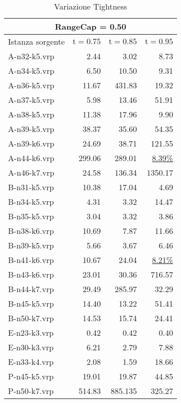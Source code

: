 \documentclass[11pt,oneside,a4paper]{article}
\begin{document}
\begin{table}
\centering
\begin{tabular}{|l|r|r|r|}
\hline
\multicolumn{4}{|c|}{RangeCap = 0.50} \\
\hline
Istanza sorgente & $\text{t}=0.75$ & $\text{t}=0.85$ & $\text{t}=0.95$ \\
\hline

A-n32-k5.vrp & 2.44 & 3.02 & 8.73 \\ 
A-n34-k5.vrp & 6.50 & 10.50 & 9.31 \\  
A-n36-k5.vrp & 11.67 & 431.83 & 19.32 \\  
A-n37-k5.vrp & 5.98 & 13.46 & 51.91 \\  
A-n38-k5.vrp & 11.38 & 17.96 & 9.90 \\  
A-n39-k5.vrp & 38.37 & 35.60 & 54.35 \\  
A-n39-k6.vrp & 24.69 & 38.71 & 121.55 \\  
A-n44-k6.vrp & 299.06 & 289.01 & \underline{8.39\%} \\  
A-n46-k7.vrp & 24.58 & 136.34 & 1350.17 \\  
B-n31-k5.vrp & 10.38 & 17.04 & 4.69 \\  
B-n34-k5.vrp & 4.31 & 3.32 & 14.47 \\  
B-n35-k5.vrp & 3.04 & 3.32 & 3.86 \\ 
B-n38-k6.vrp & 10.69 & 7.87 & 11.66 \\ 
B-n39-k5.vrp & 5.66 & 3.67 & 6.46 \\  
B-n41-k6.vrp & 10.67 & 24.04 & \underline{8.21\%} \\ 
B-n43-k6.vrp & 23.01 & 30.36 & 716.57 \\ 
B-n44-k7.vrp & 29.49 & 285.97 & 32.29 \\ 
B-n45-k5.vrp & 14.40 & 13.22 & 51.41 \\   
B-n50-k7.vrp & 14.53 & 15.74 & 24.41 \\   
E-n23-k3.vrp & 0.42 & 0.42 & 0.40 \\  
E-n30-k3.vrp & 6.21 & 2.79 & 7.88 \\  
E-n33-k4.vrp & 2.08 & 1.59 & 18.66 \\ 
P-n45-k5.vrp & 19.01 & 19.87 & 44.85 \\  
P-n50-k7.vrp & 514.83 & 885.135 & 325.27 \\ 

\hline
\end{tabular}
\caption{Variazione Tightness}\label{t_supp2}
\end{table}
\end{document}
